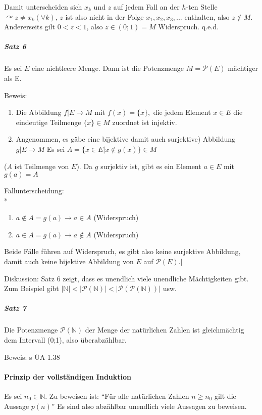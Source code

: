\documentclass[a4paper]{scrartcl}
\begin{document}
Damit unterscheiden sich $x_k$ und $z$ auf jedem Fall an der $h$-ten Stelle $\curvearrowright z \neq x_k (\forall k)$, $z$ ist also nicht in der Folge $x_1,x_2,x_3,...$ enthalten, also $z \notin M$. Andererseits gilt $0<z<1$, also $z \in (0;1)=M$ Widerspruch. q.e.d.

\subparagraph{Satz 6} Es sei $E$ eine nichtleere Menge. Dann ist die Potenzmenge $M=\mathcal{P}(E)$ mächtiger als E.

Beweis: 
\begin{enumerate}
\item Die Abbildung $f|E \rightarrow M$ mit $f(x)=\{x\},$ die jedem Element $x \in E$ die eindeutige Teilmenge $\{x\} \in M$ zuordnet ist injektiv.
\item Angenommen, es gäbe eine bijektive damit auch surjektive) Abbildung $g|E \rightarrow M$
Es sei $A=\{x \in E | x \notin g(x)\} \in M$
\end{enumerate}
($A$ ist Teilmenge von $E$). Da $g$ surjektiv ist, gibt es ein Element $a \in E$ mit $g(a) = A$

Fallunterscheidung:\\*
\begin{enumerate}
\item $a\notin A = g(a) \rightarrow a \in A$ (Widerspruch)
\item $a\in A =g(a) \rightarrow a \notin A$ (Widerspruch)
\end{enumerate}
Beide Fälle führen auf Widerspruch, es gibt also keine surjektive Abbildung, damit auch keine bijektive Abbildung von $E$ auf $\mathcal{P}(E).|$

Diskussion: Satz 6 zeigt, dass es unendlich viele unendliche Mächtigkeiten gibt. Zum Beispiel gibt $\lvert \mathbb{N} \rvert < \lvert \mathcal{P} (\mathbb{N}) \rvert < \lvert \mathcal{P} (\mathcal{P} ( \mathbb{N}))\rvert$ usw.

\subparagraph{Satz 7} Die Potenzmenge $\mathcal{P}(\mathbb{N})$ der Menge der natürlichen Zahlen ist gleichmächtig dem Intervall (0;1), also überabzählbar.

Beweis: s ÜA 1.38

\paragraph{Prinzip der vollständigen Induktion} Es sei $n_0 \in \mathbb{N}$.
Zu beweisen ist: "`Für alle natürlichen Zahlen $n\geq n_0$ gilt die Aussage $p(n)$"' Es sind also abzählbar unendlich viele Aussagen zu beweisen.
\end{document}
